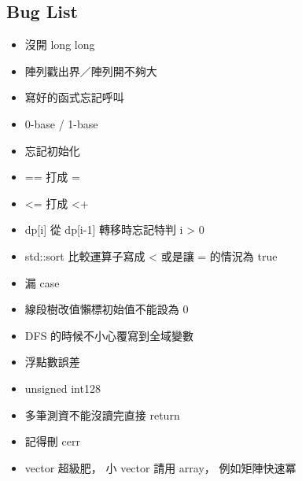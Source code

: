 \documentclass[a4paper,10pt,twocolumn,oneside]{article}
\begin{document}
\subsection{Bug List}
\begin{itemize}[nolistsep]
\item 沒開 long long
\item 陣列戳出界／陣列開不夠大
\item 寫好的函式忘記呼叫
\item 0-base / 1-base
\item 忘記初始化
\item == 打成 =
\item <= 打成 <+
\item dp[i] 從 dp[i-1] 轉移時忘記特判 i > 0
\item std::sort 比較運算子寫成 < 或是讓 = 的情況為 true
\item 漏 case
\item 線段樹改值懶標初始值不能設為 0
\item DFS 的時候不小心覆寫到全域變數
\item 浮點數誤差
\item unsigned int128
\item 多筆測資不能沒讀完直接 return
\item 記得刪 cerr
\item vector 超級肥， 小 vector 請用 array， 例如矩陣快速冪
\end{itemize}



\end{document}
